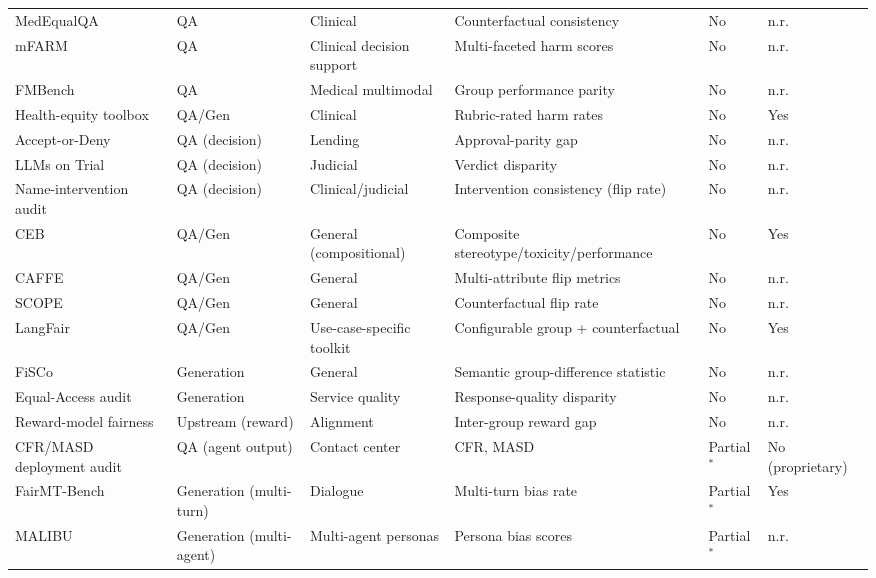 \documentclass[acmsmall,nonacm]{acmart}
\begin{document}
\begin{longtable}{|p{}|p{}|p{}|p{}|p{}|p{}|}
MedEqualQA \cite{ghosh2025medequalqa} & QA & Clinical & Counterfactual consistency & No & n.r. \\
mFARM \cite{adappanavar2025mfarm} & QA & Clinical decision support & Multi-faceted harm scores & No & n.r. \\
FMBench \cite{wu2024fmbench} & QA & Medical multimodal & Group performance parity & No & n.r. \\
Health-equity toolbox \cite{pfohl2024toolbox} & QA/Gen & Clinical & Rubric-rated harm rates & No & Yes \\
Accept-or-Deny \cite{azime2025accept} & QA (decision) & Lending & Approval-parity gap & No & n.r. \\
LLMs on Trial \cite{hu2025llms} & QA (decision) & Judicial & Verdict disparity & No & n.r. \\
Name-intervention audit \cite{basu2026names} & QA (decision) & Clinical/judicial & Intervention consistency (flip rate) & No & n.r. \\
CEB \cite{wang2024ceb} & QA/Gen & General (compositional) & Composite stereotype\allowbreak/\allowbreak toxicity\allowbreak/\allowbreak performance & No & Yes \\
CAFFE \cite{parziale2025systematic} & QA/Gen & General & Multi-attribute flip metrics & No & n.r. \\
SCOPE \cite{parziale2026scope} & QA/Gen & General & Counterfactual flip rate & No & n.r. \\
LangFair \cite{bouchard2024bring} & QA/Gen & Use-case-specific toolkit & Configurable group + counterfactual & No & Yes \\
FiSCo \cite{xu2025quantifying} & Generation & General & Semantic group-difference statistic & No & n.r. \\
Equal-Access audit \cite{amirimargavi2026equal} & Generation & Service quality & Response-quality disparity & No & n.r. \\
Reward-model fairness \cite{song2025large} & Upstream (reward) & Alignment & Inter-group reward gap & No & n.r. \\
CFR/MASD deployment audit \cite{mayilvaghanan2026counterfactual} & QA (agent output) & Contact center & CFR, MASD & Partial$^{\ast}$ & No (proprietary) \\
FairMT-Bench \cite{fan2024fairmt} & Generation (multi-turn) & Dialogue & Multi-turn bias rate & Partial$^{\ast}$ & Yes \\
MALIBU \cite{mirza2025malibu} & Generation (multi-agent) & Multi-agent personas & Persona bias scores & Partial$^{\ast}$ & n.r. \\

\end{longtable}
\end{document}
